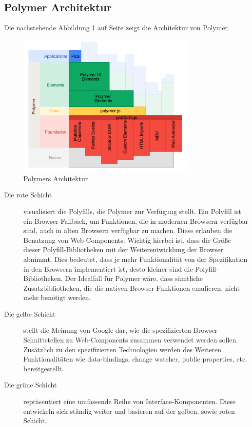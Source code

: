 \subsection{Polymer Architektur}
\label{sec:4_Polymer_Architektur}

Die nachstehende Abbildung \ref{fig:4_polymer_architecture} auf Seite \pageref{fig:4_polymer_architecture} zeigt die Architektur von Polymer.

\begin{figure}[h]
\centering
\includegraphics[width=0.8\textwidth,keepaspectratio]{images/polymer_architecture.png}
\caption[
Polymers Architektur, Urldate: 04.2014 \newline
\small\texttt{\url{http://www.polymer-project.org/images/architecture-diagram.svg}}
]{Polymers Architektur}
\label{fig:4_polymer_architecture}
\end{figure}

\begin{description}
\item[Die rote Schicht] visualisiert die Polyfills, die Polymer zur Verfügung stellt. Ein Polyfill ist ein Browser-Fallback, um Funktionen, die in modernen Browsern verfügbar sind, auch in alten Browsern verfügbar zu machen. Diese erlauben die Benutzung von Web-Components. Wichtig hierbei ist, dass die Größe dieser Polyfill-Bibliotheken mit der Weiterentwicklung der Browser abnimmt. Dies bedeutet, dass je mehr Funktionalität von der Spezifikation in den Browsern implementiert ist, desto kleiner sind die Polyfill-Bibliotheken. Der Idealfall für Polymer wäre, dass sämtliche Zusatzbibliotheken, die die nativen Browser-Funktionen emulieren, nicht mehr benötigt werden.
\item[Die gelbe Schicht] stellt die Meinung von Google dar, wie die spezifizierten Browser-Schnittstellen zu Web-Components zusammen verwendet werden sollen. Zusätzlich zu den spezifizierten Technologien werden des Weiteren Funktionalitäten wie \glqq data-bindings\grqq , \glqq change watcher\grqq , \glqq public properties\grqq , etc. bereitgestellt.
\item[Die grüne Schicht] repräsentiert eine umfassende Reihe von Interface-Komponenten. Diese entwickeln sich ständig weiter und basieren auf der gelben, sowie roten Schicht.
\end{description}